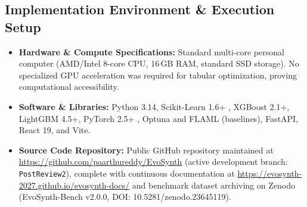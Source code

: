 \documentclass[11pt, a4paper]{article}
\begin{document}
\subsection{Implementation Environment \& Execution Setup}
\begin{itemize}[noitemsep, topsep=2pt]
    \item \textbf{Hardware \& Compute Specifications:} Standard multi-core personal computer (AMD/Intel 8-core CPU, 16\,GB RAM, standard SSD storage). No specialized GPU acceleration was required for tabular optimization, proving computational accessibility.
    \item \textbf{Software \& Libraries:} Python 3.14, Scikit-Learn 1.6+ \cite{pedregosa2011scikit}, XGBoost 2.1+, LightGBM 4.5+, PyTorch 2.5+ \cite{paszke2019pytorch}, Optuna and FLAML (baselines), FastAPI, React 19, and Vite.
    \item \textbf{Source Code Repository:} Public GitHub repository maintained at \url{https://github.com/paarthureddy/EvoSynth} (active development branch: \texttt{PostReview2}), complete with continuous documentation at \url{https://evosynth-2027.github.io/evosynth-docs/} and benchmark dataset archiving on Zenodo (EvoSynth-Bench v2.0.0, DOI: 10.5281/zenodo.23645119).
\end{itemize}
\end{document}

